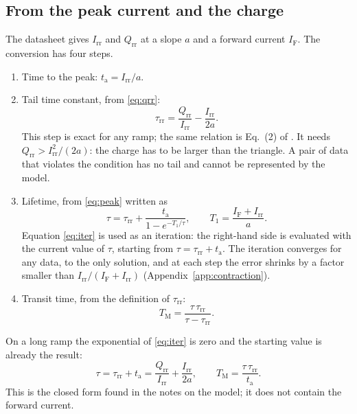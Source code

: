 \documentclass[10pt,a4paper]{scrartcl}
\newcommand{\IF}{I_\mathrm{F}}
\newcommand{\Irr}{I_\mathrm{rr}}
\newcommand{\Qrr}{Q_\mathrm{rr}}
\newcommand{\ta}{t_\mathrm{a}}
\newcommand{\taurr}{\tau_\mathrm{rr}}
\newcommand{\TM}{T_\mathrm{M}}
\newcommand{\Tone}{T_1}
\begin{document}
\subsection{From the peak current and the charge}
\label{sec:invpq}
The datasheet gives $\Irr$ and $\Qrr$ at a slope $a$ and a forward current $\IF$. The conversion has four steps.
\begin{enumerate}
\item Time to the peak: $\ta = \Irr/a$.
\item Tail time constant, from \eqref{eq:qrr}:
\begin{equation}
\taurr = \frac{\Qrr}{\Irr} - \frac{\Irr}{2a} .
\label{eq:taurr}
\end{equation}
This step is exact for any ramp; the same relation is Eq.~(2) of \cite{an6481}. It needs $\Qrr > \Irr^2/(2a)$: the charge has to be larger than the triangle. A pair of data that violates the condition has no tail and cannot be represented by the model.
\item Lifetime, from \eqref{eq:peak} written as
\begin{equation}
\tau = \taurr + \frac{\ta}{1 - e^{-\Tone/\tau}} , \qquad \Tone = \frac{\IF+\Irr}{a} .
\label{eq:iter}
\end{equation}
Equation \eqref{eq:iter} is used as an iteration: the right-hand side is evaluated with the current value of $\tau$, starting from $\tau = \taurr + \ta$. The iteration converges for any data, to the only solution, and at each step the error shrinks by a factor smaller than $\Irr/(\IF+\Irr)$ (Appendix~\ref{app:contraction}).
\item Transit time, from the definition of $\taurr$:
\begin{equation}
\TM = \frac{\tau\,\taurr}{\tau - \taurr} .
\label{eq:tm}
\end{equation}
\end{enumerate}
On a long ramp the exponential of \eqref{eq:iter} is zero and the starting value is already the result:
\begin{equation}
\tau = \taurr + \ta = \frac{\Qrr}{\Irr} + \frac{\Irr}{2a} , \qquad \TM = \frac{\tau\,\taurr}{\ta} .
\label{eq:longinv}
\end{equation}
This is the closed form found in the notes on the model; it does not contain the forward current.
\end{document}
